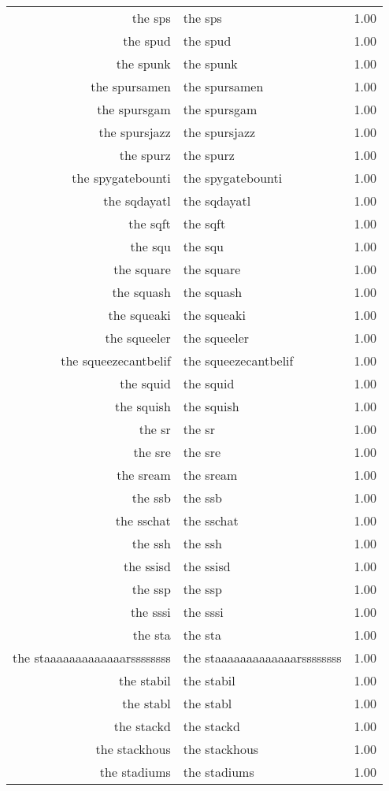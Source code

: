 \begin{table}[ht]
\begin{tabular}{rlr}
  the sps & the sps & 1.00 \\ 
  the spud & the spud & 1.00 \\ 
  the spunk & the spunk & 1.00 \\ 
  the spursamen & the spursamen & 1.00 \\ 
  the spursgam & the spursgam & 1.00 \\ 
  the spursjazz & the spursjazz & 1.00 \\ 
  the spurz & the spurz & 1.00 \\ 
  the spygatebounti & the spygatebounti & 1.00 \\ 
  the sqdayatl & the sqdayatl & 1.00 \\ 
  the sqft & the sqft & 1.00 \\ 
  the squ & the squ & 1.00 \\ 
  the square & the square & 1.00 \\ 
  the squash & the squash & 1.00 \\ 
  the squeaki & the squeaki & 1.00 \\ 
  the squeeler & the squeeler & 1.00 \\ 
  the squeezecantbelif & the squeezecantbelif & 1.00 \\ 
  the squid & the squid & 1.00 \\ 
  the squish & the squish & 1.00 \\ 
  the sr & the sr & 1.00 \\ 
  the sre & the sre & 1.00 \\ 
  the sream & the sream & 1.00 \\ 
  the ssb & the ssb & 1.00 \\ 
  the sschat & the sschat & 1.00 \\ 
  the ssh & the ssh & 1.00 \\ 
  the ssisd & the ssisd & 1.00 \\ 
  the ssp & the ssp & 1.00 \\ 
  the sssi & the sssi & 1.00 \\ 
  the sta & the sta & 1.00 \\ 
  the staaaaaaaaaaaaarssssssss & the staaaaaaaaaaaaarssssssss & 1.00 \\ 
  the stabil & the stabil & 1.00 \\ 
  the stabl & the stabl & 1.00 \\ 
  the stackd & the stackd & 1.00 \\ 
  the stackhous & the stackhous & 1.00 \\ 
  the stadiums & the stadiums & 1.00 \\ 

\end{tabular}
\end{table}
